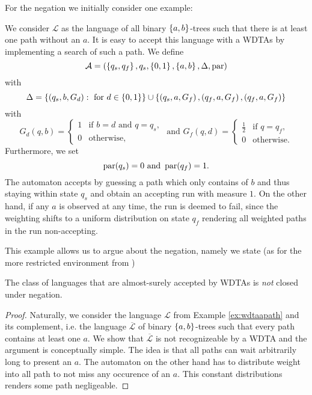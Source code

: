 For the negation we initially consider one example:
\begin{example}
  We consider $\mathcal{L}$ as the language of all binary $\left\{a,b\right\}$-trees 
  such that there is at least one path without an $a$. It is easy to accept 
  this language with a \acp{WDTA} by implementing a search of such a path. We 
  define
  \begin{equation*}
    \mathcal{A} = \left(
      \left\{q_{s}, q_{f}\right\}, q_{s}, \left\{0,1\right\}, \left\{a,b\right\}, \Delta, \operatorname{par}
    \right)
  \end{equation*}
  with
  \begin{equation*}
    \Delta = \left\{\left(q_{s}, b, G_{d}\right):\text{ for }d\in\left\{0,1\right\}\right\}\cup
    \left\{
      \left(q_{s}, a, G_{f}\right),\left(q_{f}, a, G_{f}\right),\left(q_{f}, a, G_{f}\right)
    \right\}
  \end{equation*}
  with
  \begin{equation*}
    G_{d}(q, b) = \begin{cases}
      1&\text{if }b = d\text{ and }q = q_{s},\\
      0&\text{otherwise},
    \end{cases}
    \text{ and }
    G_{f}(q, d) = \begin{cases}
      \frac{1}{2}&\text{if }q = q_{f},\\
      0&\text{otherwise}.
    \end{cases}
  \end{equation*}
  Furthermore, we set
  \begin{equation*}
    \operatorname{par}(q_{s}) = 0\text{ and }\operatorname{par}(q_{f}) = 1.
  \end{equation*}
  The automaton accepts by guessing a path which only contains of $b$ and thus
  staying within state $q_{s}$ and obtain an accepting run with measure $1$.
  On the other hand, if any $a$ is observed at any time, the run is deemed to
  fail, since the weighting shifts to a uniform distribution on state $q_{f}$
  rendering all weighted paths in the run non-accepting.
  \label{ex:wdtaapath}
\end{example}
This example allows us to argue about the negation, namely we state (as for the
more restricted environment from \cite[Proposition 15]{RandAutoInfTrees})
\begin{proposition}
  The class of languages that are almost-surely accepted by \acp{WDTA} is 
  \emph{not} closed under negation.
\end{proposition}
\begin{proof}
  Naturally, we consider the language $\mathcal{L}$ from Example 
  \ref{ex:wdtaapath} and its complement, i.e. the language 
  $\overline{\mathcal{L}}$ of binary $\left\{a,b\right\}$-trees such that every path 
  contains at least one $a$. We show that $\overline{\mathcal{L}}$ is not 
  recognizeable by a \ac{WDTA} and the argument is conceptually simple. The 
  idea is that all paths can wait arbitrarily long to present an $a$. The 
  automaton on the other hand has to distribute weight into all path to not
  miss any occurence of an $a$. This constant distributions renders some path
  negligeable.

\end{proof}

